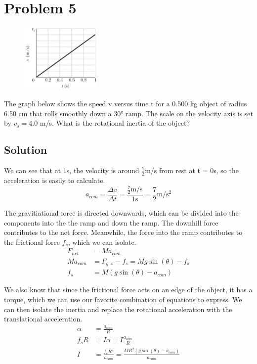 \documentclass[12pt]{article}
\begin{document}
\pagebreak
\section{Problem 5}
\begin{figure}
    \vspace{-50pt}
    \includegraphics[width=0.35\textwidth]{graph_5.png} 
\end{figure}
The graph below shows the speed v versus time t for a 0.500 kg object of radius 6.50 cm that rolls smoothly down a 30\unit{\degree} ramp. The scale on the velocity axis is set by $v_s = 4.0$ m/s. What is the rotational inertia of the object?

\subsection{Solution}
We can see that at 1s, the velocity is around $\frac{7}{2}$m/s from rest at t = 0s, so the acceleration is easily to calculate.
\begin{equation}
    a_{com} =   \frac{\Delta v}{\Delta t} 
        = \frac{\frac{7}{2}\unit{\meter/\second}}{1\unit{\second}} 
        = \frac{7}{2}\unit{\meter/\second^2}
\end{equation}

The gravitiational force is directed downwards, which can be divided into the components into the the ramp and down the ramp. The downhill force contributes to the net force. Meanwhile, the force into the ramp contributes to the frictional force $f_s$, which we can isolate.
\begin{align}
    F_{net} &=  Ma_{com}\\
    Ma_{com}    &=  F_{g;x} - f_s
        =   Mg\sin(\theta) - f_s\\
    f_s &=  M(g\sin(\theta) - a_{com})
\end{align}

We also know that since the frictional force acts on an edge of the object, it has a torque, which we can use our favorite combination of equations to express. We can then isolate the inertia and replace the rotational acceleration with the translational acceleration.
\begin{align}
    \alpha  &=  \frac{a_{com}}{R}\\
    f_s R   &=  I\alpha
        =   I\frac{a_{com}}{R}\\
    I   &=  \frac{f_s R^2}{a_{com}}
        =   \frac{MR^2(g\sin(\theta) - a_{com})}{a_{com}}
\end{align}
\end{document}
